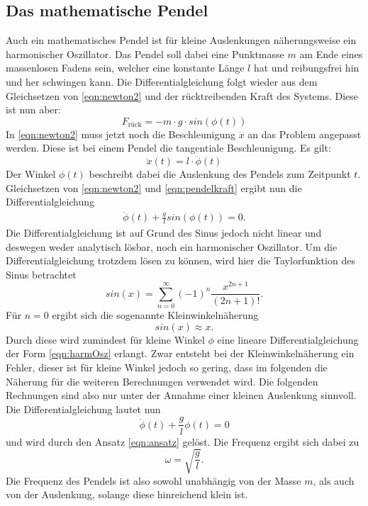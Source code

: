 \subsection{Das mathematische Pendel}
Auch ein mathematisches Pendel ist für kleine Auslenkungen näherungsweise ein harmonischer Oszillator. Das Pendel soll dabei eine
Punktmasse $m$ am Ende eines massenlosen Fadens sein, welcher eine konstante Länge $l$ hat und reibungsfrei hin und her schwingen kann.
Die Differentialgleichung folgt wieder aus dem Gleichsetzen von \eqref{eqn:newton2} und der rücktreibenden Kraft des Systems.
Diese ist nun aber:
\begin{equation}
    F_\text{rück}=-m\cdot g\cdot sin(\phi(t)) \label{eqn:pendelkraft}
\end{equation}
In \eqref{eqn:newton2} muss jetzt noch die Beschleunigung $\ddot x$ an das Problem angepasst werden. Diese ist bei einem Pendel die tangentiale
Beschleunigung. Es gilt:
\begin{equation}
    \ddot x(t)=l\cdot \ddot{\phi}(t)
\end{equation}
Der Winkel $\phi(t)$ beschreibt dabei die Auslenkung des Pendels zum Zeitpunkt $t$. Gleichsetzen von \eqref{eqn:newton2} und
\eqref{eqn:pendelkraft} ergibt nun die Differentialgleichung
\begin{eqnarray}
    \ddot{\phi}(t)+\frac{g}{l}sin(\phi(t))=0.
\end{eqnarray}
Die Differentialgleichung ist auf Grund des Sinus jedoch nicht linear und deswegen weder analytisch lösbar, noch ein harmonischer Oszillator.
Um die Differentialgleichung trotzdem lösen zu können, wird hier die Taylorfunktion des Sinus betrachtet
\begin{equation}
    sin(x)=\sum_{n=0}^\infty (-1)^n\frac{x^{2n+1}}{(2n+1)!}.
\end{equation}
Für $n=0$ ergibt sich die sogenannte Kleinwinkelnäherung
\begin{equation}
    sin(x)\approx x. \label{eqn:kleinwinkel}
\end{equation}
Durch diese wird zumindest für kleine Winkel $\phi$ eine lineare Differentialgleichung der Form \eqref{eqn:harmOsz} erlangt. Zwar entsteht bei der
Kleinwinkelnäherung ein Fehler, dieser ist für kleine Winkel jedoch so gering, dass im folgenden die Näherung für die weiteren Berechnungen verwendet wird.
Die folgenden Rechnungen sind also nur unter der Annahme einer kleinen Auslenkung sinnvoll.
\\
Die Differentialgleichung lautet nun
\begin{equation}
    \ddot{\phi}(t)+\frac{g}{l}\phi(t)=0
\end{equation}
und wird durch den Ansatz \eqref{eqn:ansatz} gelöst. Die Frequenz ergibt sich dabei zu
\begin{equation}
    \omega=\sqrt{\frac{g}{l}}.
\end{equation}
Die Frequenz des Pendels ist also sowohl unabhängig von der Masse $m$, als auch von der Auslenkung, solange diese hinreichend klein ist.

